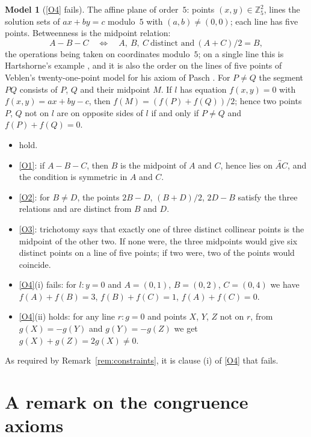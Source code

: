 \documentclass[11pt]{amsart}
\newcommand{\Z}{\mathbb{Z}}
\theoremstyle{definition}
\newtheorem{model}[thm]{Model}
\theoremstyle{remark}
\begin{document}
\begin{model}[\ref{O4} fails]\label{mod:O4}
The affine plane of order~$5$: points $(x,y)\in\Z_{5}^{2}$, lines the solution sets of $ax+by=c$ modulo~$5$ with $(a,b)\neq(0,0)$; each line has five points. Betweenness is the midpoint relation:
\begin{equation*}
A-B-C\quad\Longleftrightarrow\quad A,\ B,\ C\ \text{distinct and}\ (A+C)/2=B,
\end{equation*}
the operations being taken on coordinates modulo~$5$; on a single line this is Hartshorne's example \cite[Exercise~7.5]{Har}, and it is also the order on the lines of five points of Veblen's twenty-one-point model for his axiom of Pasch \cite[\S\S7--8]{Veb}. For $P\neq Q$ the segment $PQ$ consists of $P$, $Q$ and their midpoint $M$. If $l$ has equation $f(x,y)=0$ with $f(x,y)=ax+by-c$, then $f(M)=(f(P)+f(Q))/2$; hence two points $P$, $Q$ not on $l$ are on opposite sides of $l$ if and only if $P\neq Q$ and $f(P)+f(Q)=0$.
\begin{itemize}
\item [\textbf{I}] hold.
\item \ref{O1}: if $A-B-C$, then $B$ is the midpoint of $A$ and $C$, hence lies on $\overleftrightarrow{AC}$, and the condition is symmetric in $A$ and $C$.
\item \ref{O2}: for $B\neq D$, the points $2B-D$, $(B+D)/2$, $2D-B$ satisfy the three relations and are distinct from $B$ and $D$.
\item \ref{O3}: trichotomy says that exactly one of three distinct collinear points is the midpoint of the other two. If none were, the three midpoints would give six distinct points on a line of five points; if two were, two of the points would coincide.
\item \ref{O4}(i) fails: for $l\colon y=0$ and $A=(0,1)$, $B=(0,2)$, $C=(0,4)$ we have $f(A)+f(B)=3$, $f(B)+f(C)=1$, $f(A)+f(C)=0$.
\item \ref{O4}(ii) holds: for any line $r\colon g=0$ and points $X$, $Y$, $Z$ not on $r$, from $g(X)=-g(Y)$ and $g(Y)=-g(Z)$ we get $g(X)+g(Z)=2g(X)\neq0$.
\end{itemize}
As required by Remark~\ref{rem:constraints}, it is clause (i) of \ref{O4} that fails.
\end{model}

\section{A remark on the congruence axioms}\label{sec:congr}
\end{document}
